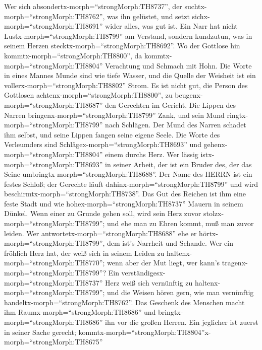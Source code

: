  Wer sich absondertx-morph=``strongMorph:TH8737'', der
suchtx-morph=``strongMorph:TH8762'', was ihn gelüstet, und setzt
sichx-morph=``strongMorph:TH8691'' wider alles, was gut ist.
 Ein Narr hat nicht Lustx-morph=``strongMorph:TH8799'' am
Verstand, sondern kundzutun, was in seinem Herzen
stecktx-morph=``strongMorph:TH8692''.  Wo der Gottlose hin
kommtx-morph=``strongMorph:TH8800'', da
kommtx-morph=``strongMorph:TH8804'' Verachtung und Schmach mit Hohn.
 Die Worte in eines Mannes Munde sind wie tiefe Wasser, und
die Quelle der Weisheit ist ein vollerx-morph=``strongMorph:TH8802''
Strom.  Es ist nicht gut, die Person des Gottlosen
achtenx-morph=``strongMorph:TH8800'', zu
beugenx-morph=``strongMorph:TH8687'' den Gerechten im Gericht.
 Die Lippen des Narren bringenx-morph=``strongMorph:TH8799''
Zank, und sein Mund ringtx-morph=``strongMorph:TH8799'' nach Schlägen.
 Der Mund des Narren schadet ihm selbst, und seine Lippen
fangen seine eigene Seele.  Die Worte des Verleumders sind
Schlägex-morph=``strongMorph:TH8693'' und
gehenx-morph=``strongMorph:TH8804'' einem durchs Herz.  Wer
lässig istx-morph=``strongMorph:TH8693'' in seiner Arbeit, der ist ein
Bruder des, der das Seine umbringtx-morph=``strongMorph:TH8688''.
 Der Name des HERRN ist ein festes Schloß; der Gerechte
läuft dahinx-morph=``strongMorph:TH8799'' und wird
beschirmtx-morph=``strongMorph:TH8738''.  Das Gut des
Reichen ist ihm eine feste Stadt und wie
hohex-morph=``strongMorph:TH8737'' Mauern in seinem Dünkel.
 Wenn einer zu Grunde gehen soll, wird sein Herz zuvor
stolzx-morph=``strongMorph:TH8799''; und ehe man zu Ehren kommt, muß man
zuvor leiden.  Wer antwortetx-morph=``strongMorph:TH8688''
ehe er hörtx-morph=``strongMorph:TH8799'', dem ist's Narrheit und
Schande.  Wer ein fröhlich Herz hat, der weiß sich in
seinem Leiden zu haltenx-morph=``strongMorph:TH8770''; wenn aber der Mut
liegt, wer kann's tragenx-morph=``strongMorph:TH8799''? 
Ein verständigesx-morph=``strongMorph:TH8737'' Herz weiß sich vernünftig
zu haltenx-morph=``strongMorph:TH8799''; und die Weisen hören gern, wie
man vernünftig handeltx-morph=``strongMorph:TH8762''.  Das
Geschenk des Menschen macht ihm Raumx-morph=``strongMorph:TH8686'' und
bringtx-morph=``strongMorph:TH8686'' ihn vor die großen Herren.
 Ein jeglicher ist zuerst in seiner Sache gerecht;
kommtx-morph=``strongMorph:TH8804''\textbar x-morph=``strongMorph:TH8675''
